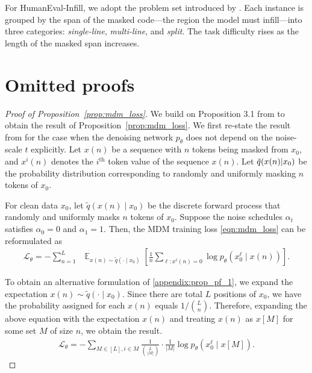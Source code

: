 For HumanEval-Infill, we adopt the problem set introduced by \cite{bavarian2022efficienttraininglanguagemodels}. Each instance is grouped by the span of the masked code—the region the model must infill—into three categories: \textit{single-line}, \textit{multi-line}, and \textit{split}. The task difficulty rises as the length of the masked span increases.


\section{Omitted proofs}
\label{appenix:mdm-equivalent-loss}

\begin{proof}[Proof of Proposition~\ref{prop:mdm_loss}]
We build on Proposition 3.1 from \cite{zheng2024maskeddiffusionmodelssecretly} to obtain the result of Proposition~\ref{prop:mdm_loss}. We first re-state the result from \cite{zheng2024maskeddiffusionmodelssecretly} for the case when the denoising network $p_\theta$ does not depend on the noise-scale $t$ explicitly. Let $x(n)$ be a sequence with $n$ tokens being masked from $x_0$, and $x^i(n)$ denotes the $i^{\textrm{th}}$ token value of the sequence $x(n)$. Let $\Tilde{q}(x(n) | x_0)$ be the probability distribution corresponding to randomly and uniformly masking $n$ tokens of $x_0$. 

\begin{proposition}
For clean data $x_0$, let $\tilde{q}(x(n)\mid x_0)$ be the discrete forward process that randomly and uniformly masks $n$ tokens of $x_0$.
Suppose the noise schedules $\alpha_t$ satisfies $\alpha_0 = 0$ and $\alpha_1 = 1$. Then, the MDM training loss \eqref{eqn:mdm_loss} can be reformulated as
\begin{align} \label{appendix:prop_pf_1}
    \mathcal{L}_\theta = - \sum_{n=1}^L \;\; \mathop{\mathbb{E}}_{x(n)\sim \tilde{q}(\cdot\mid x_0)}\left[\frac{1}{n}\sum_{\ell:x^\ell(n) = 0} \log p_\theta(x_0^\ell\mid x(n))\right].
\end{align}
\end{proposition}
To obtain an alternative formulation of \eqref{appendix:prop_pf_1}, we expand the expectation $x(n)\sim \tilde{q}(\cdot\mid x_0)$. Since there are total $L$ positions of $x_0$, we have the probability assigned for each $x(n)$ equals $1/\binom{L}{n}$. Therefore, expanding the above equation with the expectation $x(n)$ and treating $x(n)$ as $x[M]$ for some set $M$ of size $n$, we obtain the result. 
\begin{align*}
      \mathcal{L}_\theta 
      = -\sum_{M \in [L], i \in M} \frac{1}{\binom{L}{|M|}} \cdot \frac{1}{|M|} \log p_\theta(x_0^\ell\mid x[M]).
\end{align*}
\end{proof}

